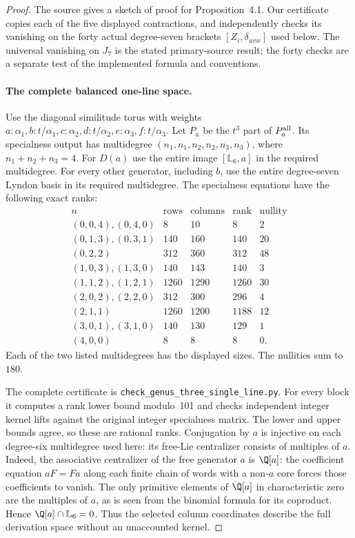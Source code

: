 \begin{proof}
The source gives a sketch of proof for Proposition~4.1. Our certificate
copies each of the five displayed contractions, and independently
checks its vanishing on the forty actual degree-seven brackets
$[Z_i,\delta_{uvw}]$ used below. The universal vanishing on $J_7$
is the stated primary-source result; the forty checks are a separate
test of the implemented formula and conventions.

\paragraph{The complete balanced one-line space.}
Use the diagonal similitude torus with weights
$a:\alpha_1,b:t/\alpha_1,c:\alpha_2,d:t/\alpha_2,
e:\alpha_3,f:t/\alpha_3$. Let $P_a$ be the $t^3$ part of
$P_a^{\rm all}$. Its specialness output has multidegree
$(n_1,n_1,n_2,n_2,n_3,n_3)$, where $n_1+n_2+n_3=4$.
For $D(a)$ use the entire image $[\mathbb L_6,a]$ in the
required multidegree. For every other generator, including $b$,
use the entire degree-seven Lyndon basis in its required multidegree.
The specialness equations have the following exact ranks:
\[
\begin{array}{c|r|r|r|r}
n&\text{rows}&\text{columns}&\text{rank}&\text{nullity}\\\hline
(0,0,4),(0,4,0)&8&10&8&2\\
(0,1,3),(0,3,1)&140&160&140&20\\
(0,2,2)&312&360&312&48\\
(1,0,3),(1,3,0)&140&143&140&3\\
(1,1,2),(1,2,1)&1260&1290&1260&30\\
(2,0,2),(2,2,0)&312&300&296&4\\
(2,1,1)&1260&1200&1188&12\\
(3,0,1),(3,1,0)&140&130&129&1\\
(4,0,0)&8&8&8&0.
\end{array}                                                   \tag{SL.5}
\]
Each of the two listed multidegrees has the displayed sizes.
The nullities sum to $180$.

The complete certificate is
\texttt{check\_genus\_three\_single\_line.py}.
For every block it computes a rank lower bound modulo~101 and
checks independent integer kernel lifts against the original
integer specialness matrix. The lower and upper bounds agree,
so these are rational ranks. Conjugation by $a$ is injective on
each degree-six multidegree used here: its free-Lie centralizer
consists of multiples of $a$. Indeed, the associative centralizer
of the free generator $a$ is $\Q[a]$: the coefficient equation
$aF=Fa$ along each finite chain of words with a non-$a$ core
forces those coefficients to vanish. The only primitive elements
of $\Q[a]$ in characteristic zero are the multiples of $a$,
as is seen from the binomial formula for its coproduct.
Hence $\Q[a]\cap\mathbb L_6=0$. Thus the selected column coordinates
describe the full derivation space without an unaccounted kernel.


\end{proof}
